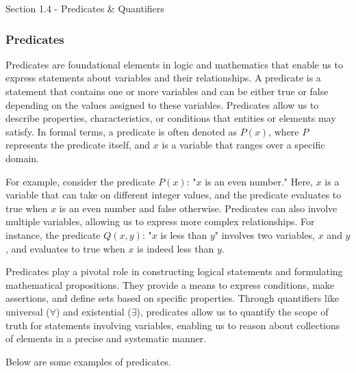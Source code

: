 \begin{notes}{Section 1.4 - Predicates \& Quantifiers}
    \subsubsection*{Predicates}

    Predicates are foundational elements in logic and mathematics that enable us to express statements about variables and their relationships. A predicate is a statement that contains one or more variables and can be either true or false 
    depending on the values assigned to these variables. Predicates allow us to describe properties, characteristics, or conditions that entities or elements may satisfy. In formal terms, a predicate is often denoted as $P(x)$, where $P$ 
    represents the predicate itself, and $x$ is a variable that ranges over a specific domain.
    
    For example, consider the predicate $P(x)$: "$x$ is an even number." Here, $x$ is a variable that can take on different integer values, and the predicate evaluates to true when $x$ is an even number and false otherwise. Predicates can 
    also involve multiple variables, allowing us to express more complex relationships. For instance, the predicate $Q(x, y)$: "$x$ is less than $y$" involves two variables, $x$ and $y$, and evaluates to true when $x$ is indeed less than $y$.
    
    Predicates play a pivotal role in constructing logical statements and formulating mathematical propositions. They provide a means to express conditions, make assertions, and define sets based on specific properties. Through quantifiers 
    like universal ($\forall$) and existential ($\exists$), predicates allow us to quantify the scope of truth for statements involving variables, enabling us to reason about collections of elements in a precise and systematic manner.
    
    \begin{Highlight}
        Below are some examples of predicates.


\end{Highlight}
\end{notes}
